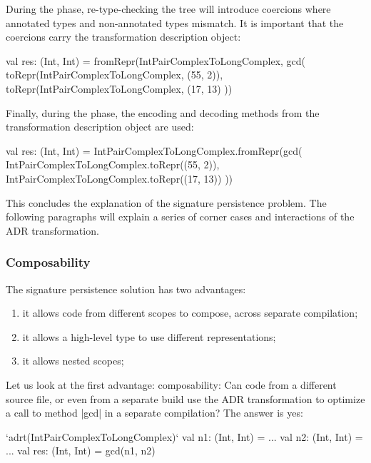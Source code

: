 During the \coerce{} phase, re-type-checking the tree will introduce coercions where annotated types and non-annotated types mismatch. It is important that the coercions carry the transformation description object:

\begin{lstlisting-nobreak}
val res: (Int, Int) =
  fromRepr(IntPairComplexToLongComplex, gcd(
    toRepr(IntPairComplexToLongComplex, (55, 2)),
    toRepr(IntPairComplexToLongComplex, (17, 13)
  ))
\end{lstlisting-nobreak}

Finally, during the \commit{} phase, the encoding and decoding methods from the transformation description object are used:

\begin{lstlisting-nobreak}
val res: (Int, Int) =
  IntPairComplexToLongComplex.fromRepr(gcd(
    IntPairComplexToLongComplex.toRepr((55, 2)),
    IntPairComplexToLongComplex.toRepr((17, 13))
  ))
\end{lstlisting-nobreak}

This concludes the explanation of the signature persistence problem. The following paragraphs will explain a series of corner cases and interactions of the ADR transformation.

\subsubsection{Composability}

The signature persistence solution has two advantages:
\begin{enumerate}
  \item it allows code from different scopes to compose, across separate compilation;
  \item it allows a high-level type to use different representations;
  \item it allows nested scopes;
\end{enumerate}

Let us look at the first advantage: composability: Can code from a different source file, or even from a separate build use the ADR transformation to optimize a call to method |gcd| in a separate compilation? The answer is yes:

\begin{lstlisting-nobreak}
`adrt(IntPairComplexToLongComplex)` {
  val n1: (Int, Int) = ...
  val n2: (Int, Int) = ...
  val res: (Int, Int) = gcd(n1, n2)
}
\end{lstlisting-nobreak}

